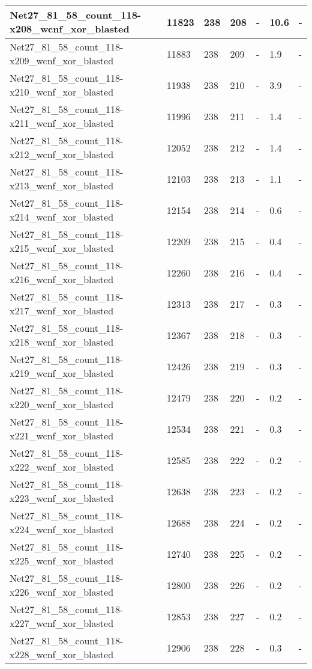 \begin{scriptsize}
\begin{longtable}{|p{5cm}|l|l|l|l|l|l|}
Net27\_81\_58\_count\_118-x208\_wcnf\_xor\_blasted&11823&238&208&-&10.6&- \\ \hline 
Net27\_81\_58\_count\_118-x209\_wcnf\_xor\_blasted&11883&238&209&-&1.9&- \\ \hline 
Net27\_81\_58\_count\_118-x210\_wcnf\_xor\_blasted&11938&238&210&-&3.9&- \\ \hline 
Net27\_81\_58\_count\_118-x211\_wcnf\_xor\_blasted&11996&238&211&-&1.4&- \\ \hline 
Net27\_81\_58\_count\_118-x212\_wcnf\_xor\_blasted&12052&238&212&-&1.4&- \\ \hline 
Net27\_81\_58\_count\_118-x213\_wcnf\_xor\_blasted&12103&238&213&-&1.1&- \\ \hline 
Net27\_81\_58\_count\_118-x214\_wcnf\_xor\_blasted&12154&238&214&-&0.6&- \\ \hline 
Net27\_81\_58\_count\_118-x215\_wcnf\_xor\_blasted&12209&238&215&-&0.4&- \\ \hline 
Net27\_81\_58\_count\_118-x216\_wcnf\_xor\_blasted&12260&238&216&-&0.4&- \\ \hline 
Net27\_81\_58\_count\_118-x217\_wcnf\_xor\_blasted&12313&238&217&-&0.3&- \\ \hline 
Net27\_81\_58\_count\_118-x218\_wcnf\_xor\_blasted&12367&238&218&-&0.3&- \\ \hline 
Net27\_81\_58\_count\_118-x219\_wcnf\_xor\_blasted&12426&238&219&-&0.3&- \\ \hline 
Net27\_81\_58\_count\_118-x220\_wcnf\_xor\_blasted&12479&238&220&-&0.2&- \\ \hline 
Net27\_81\_58\_count\_118-x221\_wcnf\_xor\_blasted&12534&238&221&-&0.3&- \\ \hline 
Net27\_81\_58\_count\_118-x222\_wcnf\_xor\_blasted&12585&238&222&-&0.2&- \\ \hline 
Net27\_81\_58\_count\_118-x223\_wcnf\_xor\_blasted&12638&238&223&-&0.2&- \\ \hline 
Net27\_81\_58\_count\_118-x224\_wcnf\_xor\_blasted&12688&238&224&-&0.2&- \\ \hline 
Net27\_81\_58\_count\_118-x225\_wcnf\_xor\_blasted&12740&238&225&-&0.2&- \\ \hline 
Net27\_81\_58\_count\_118-x226\_wcnf\_xor\_blasted&12800&238&226&-&0.2&- \\ \hline 
Net27\_81\_58\_count\_118-x227\_wcnf\_xor\_blasted&12853&238&227&-&0.2&- \\ \hline 
Net27\_81\_58\_count\_118-x228\_wcnf\_xor\_blasted&12906&238&228&-&0.3&- \\ \hline 

\end{longtable}
\end{scriptsize}
